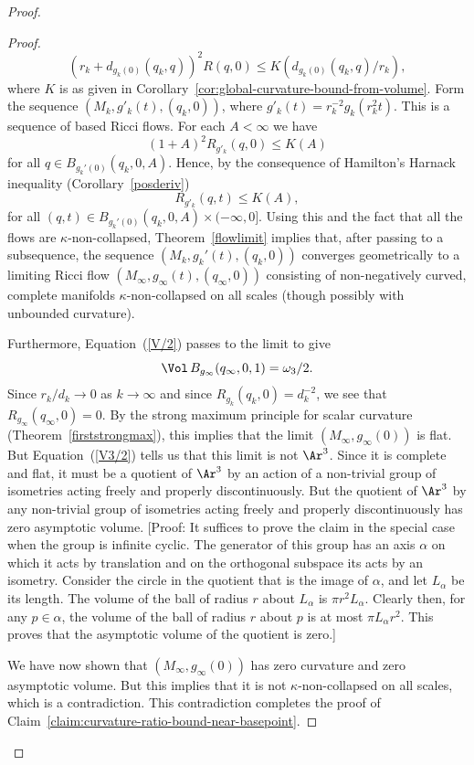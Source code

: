 \begin{proof}
\begin{proof}
$$(r_k+d_{g_k(0)}(q_k,q))^2R(q,0)\le K(d_{g_k(0)}(q_k,q)/r_k),$$
where $K$ is as given in Corollary~\ref{cor:global-curvature-bound-from-volume}. Form the sequence
$(M_k,g'_k(t),(q_k,0))$, where $g'_k(t)=r_k^{-2}g_k(r_k^2t)$. This
is a sequence  of based Ricci flows. For each $A<\infty$ we have
$$(1+A)^2R_{g'_k}(q,0)\le K(A)$$ for all
$q\in B_{g_k'(0)}(q_k,0,A)$. Hence, by the consequence of Hamilton's
Harnack inequality (Corollary~\ref{posderiv})
$$R_{g'_k}(q,t)\le K(A),$$
for all  $(q,t)\in B_{g_k'(0)}(q_k,0,A)\times(-\infty,0]$. Using
this and the fact that all the flows are $\kappa$-non-collapsed,
Theorem~\ref{flowlimit} implies that, after passing to a
subsequence, the sequence $(M_k,g_k'(t),(q_k,0))$ converges
geometrically to a limiting Ricci flow
$(M_\infty,g_\infty(t),(q_\infty,0))$ consisting of non-negatively
curved, complete manifolds $\kappa$-non-collapsed on all scales
(though possibly with unbounded curvature).

Furthermore, Equation~(\ref{V/2}) passes to the limit to give
\begin{equation}\label{V3/2}
\Vol\,B_{g_\infty}(q_\infty,0,1)=\omega_3/2. \end{equation}
 Since $r_k/d_k\rightarrow 0$ as $k\rightarrow\infty$ and since $R_{g_k}(q_k,0)=d_k^{-2}$, we see that
$R_{g_\infty}(q_\infty,0)=0$. By the strong maximum principle for
scalar curvature (Theorem~\ref{firststrongmax}), this implies that
the limit $(M_\infty,g_\infty(0))$ is flat. But
Equation~(\ref{V3/2}) tells us that this limit is not $\Ar^3$. Since
it is complete and flat, it must be a quotient of $\Ar^3$ by an
action of a non-trivial group of isometries acting freely and
properly discontinuously. But the quotient of $\Ar^3$ by any
non-trivial group of isometries acting freely and properly
discontinuously has zero asymptotic volume. [Proof: It suffices to
prove the claim in the special case when the group is infinite
cyclic. The generator of this group has an axis $\alpha$ on which it
acts by translation and on the orthogonal subspace its acts by an
isometry. Consider the circle in the quotient that is the image of
$\alpha$, and let $L_\alpha$ be its length. The volume of the ball
of radius $r$ about $L_\alpha$ is $\pi r^{2}L_\alpha$. Clearly then,
for any $p\in \alpha$, the volume of the ball of radius $r$ about
$p$ is at most $\pi L_\alpha r^2$. This proves that the asymptotic
volume of the quotient is zero.]

We have now shown that $(M_\infty,g_\infty(0))$ has zero curvature and zero
asymptotic volume. But this implies that it is not $\kappa$-non-collapsed on
all scales, which is a contradiction. This contradiction completes the proof of
Claim~\ref{claim:curvature-ratio-bound-near-basepoint}.
\end{proof}


\end{proof}
